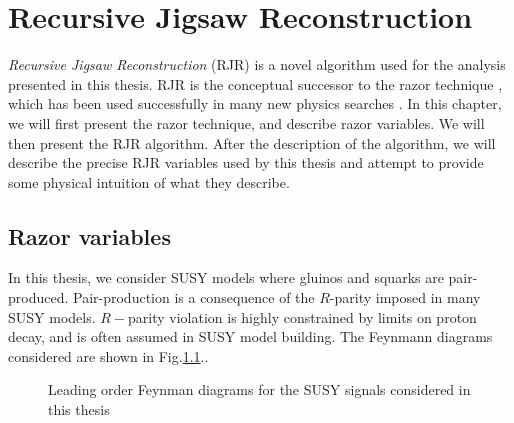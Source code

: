 

\chapter[][Recursive Jigsaw Reconstruction]{Recursive Jigsaw Reconstruction}

\textit{Recursive Jigsaw Reconstruction} (RJR) \cite{Jackson:2016mfb,ATLAS-CONF-2016-078} is a novel algorithm used for the analysis presented in this thesis.
RJR is the conceptual successor to the razor technique \cite{Rogan:2010kb,Buckley:2013kua}, which has been used successfully in many new physics searches \cite{SUSY-2014-05,SUSY-2014-06,CMS-SUS-13-004,CMS-SUS-12-005,CMS-SUS-11-024,SUSY-2011-22}.
In this chapter, we will first present the razor technique, and describe razor variables.
We will then present the RJR algorithm.
After the description of the algorithm, we will describe the precise RJR variables used by this thesis and attempt to provide some physical intuition of what they describe.

\section{Razor variables}

In this thesis, we consider SUSY models where gluinos and squarks are pair-produced.
Pair-production is a consequence of the $R$-parity imposed in many SUSY models.
$R-$parity violation is highly constrained by limits on proton decay, and is often assumed in SUSY model building.
The Feynmann diagrams considered are shown in Fig.\ref{fig:feynmann_signal}..
\begin{figure}
\caption{Leading order Feynman diagrams for the SUSY signals considered in this thesis} \label{fig:feynmann_signal}
\end{figure}

